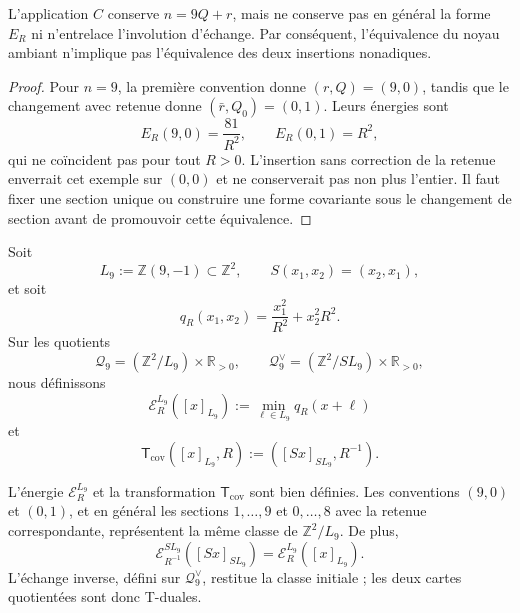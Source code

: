 \begin{proposition}
\label{prop:cierre-vtm-obstruccion-secciones-nonadicas}
L'application \(C\) conserve \(n=9Q+r\), mais ne conserve pas en général la forme
\(E_R\) ni n'entrelace l'involution d'échange. Par conséquent, l'équivalence
du noyau ambiant n'implique pas l'équivalence des deux insertions
nonadiques.
\end{proposition}

\begin{proof}
Pour \(n=9\), la première convention donne \((r,Q)=(9,0)\), tandis que le changement avec retenue donne
\((\bar r,Q_0)=(0,1)\). Leurs énergies sont
\[
 E_R(9,0)=\frac{81}{R^2},
 \qquad E_R(0,1)=R^2,
\]
qui ne coïncident pas pour tout \(R>0\). L'insertion sans correction de
la retenue enverrait cet exemple sur \((0,0)\) et ne conserverait pas non plus l'entier.
Il faut fixer une section unique ou construire une forme covariante sous le
changement de section avant de promouvoir cette équivalence.
\end{proof}

\begin{definition}
\label{def:cierre-vtm-energia-covariante-seccion}
Soit
\[
 L_9:=\mathbb Z(9,-1)\subset\mathbb Z^2,
 \qquad
 S(x_1,x_2)=(x_2,x_1),
\]
et soit
\[
 q_R(x_1,x_2)=\frac{x_1^2}{R^2}+x_2^2R^2.
\]
Sur les quotients
\[
 \mathscr Q_9=(\mathbb Z^2/L_9)\times\mathbb R_{>0},
 \qquad
 \mathscr Q_9^\vee=(\mathbb Z^2/SL_9)\times\mathbb R_{>0},
\]
nous définissons
\[
 \mathcal E_R^{L_9}([x]_{L_9})
 :=\min_{\ell\in L_9}q_R(x+\ell)
\]
et
\[
 \mathsf T_{\mathrm{cov}}([x]_{L_9},R)
 :=([Sx]_{SL_9},R^{-1}).
\]
\end{definition}

\begin{theorem}
\label{thm:cierre-vtm-equivalencia-covariante-secciones}
L'énergie \(\mathcal E_R^{L_9}\) et la transformation
\(\mathsf T_{\mathrm{cov}}\) sont bien définies. Les conventions
\((9,0)\) et \((0,1)\), et en général les sections \(1,\ldots,9\) et
\(0,\ldots,8\) avec la retenue correspondante, représentent la même classe
de \(\mathbb Z^2/L_9\). De plus,
\[
 \boxed{
 \mathcal E_{R^{-1}}^{SL_9}([Sx]_{SL_9})
 =\mathcal E_R^{L_9}([x]_{L_9}).}
\]
L'échange inverse, défini sur \(\mathscr Q_9^\vee\), restitue la
classe initiale ; les deux cartes quotientées sont donc T-duales.
\end{theorem}

